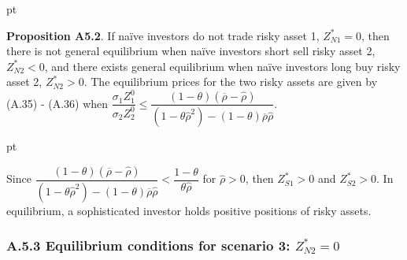 \documentclass[10pt]{article}
\begin{document}
 pt

{\bf Proposition A5.2}. If na\"ive investors do not trade risky asset 1, $ Z_{N 1}^* = 0 $, then there is not general equilibrium when na\"ive investors short sell risky asset 2, $ Z_{N 2}^* < 0 $, and there exists general equilibrium when na\"ive investors long buy risky asset 2, $ Z_{N 2}^* > 0 $. The equilibrium prices for the two risky assets are given by (A.35) - (A.36) when $ \dfrac{\sigma_1 Z_1^0}{\sigma_2 Z_2^0} \leqslant \dfrac{(1 - \theta) (\overline{\rho} - {\hat \rho})}{(1 - \theta {\hat \rho}^2) - (1 - \theta) \overline{\rho} {\hat \rho}} $.

 pt

Since $ \dfrac{(1 - \theta) (\overline{\rho} - {\hat \rho})}{(1 - \theta {\hat \rho}^2) - (1 - \theta) \overline{\rho} {\hat \rho}} < \dfrac{1 - \theta}{\theta {\hat \rho}} $ for $ \hat \rho > 0 $, then $ Z_{S 1}^* > 0 $ and $ Z_{S 2}^* > 0 $. In equilibrium, a sophisticated investor holds positive positions of risky assets.

\subsubsection*{A.5.3 \quad Equilibrium conditions for scenario 3: $ Z_{N 2}^* = 0 $}
\end{document}
